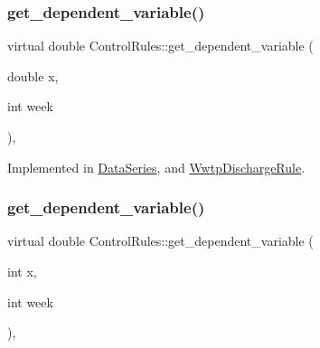 \mbox{\label{classControlRules_a4c5a86844c3d6409bfa0ba2b058f82e7_a4c5a86844c3d6409bfa0ba2b058f82e7}} 
\subsubsection{\texorpdfstring{get\+\_\+dependent\+\_\+variable()}{get\_dependent\_variable()}\hspace{0.1cm}{\footnotesize\ttfamily [3/4]}}
{\footnotesize\ttfamily virtual double Control\+Rules\+::get\+\_\+dependent\+\_\+variable (\begin{DoxyParamCaption}\item[{double}]{x,  }\item[{int}]{week }\end{DoxyParamCaption})\hspace{0.3cm}{\ttfamily [private]}, {}}



Implemented in \mbox{\hyperlink{classDataSeries_a1242b9fdbdbb4e91a0e8b9e2383085d8_a1242b9fdbdbb4e91a0e8b9e2383085d8}{Data\+Series}}, and \mbox{\hyperlink{classWwtpDischargeRule_a10eb6f901b6479dadc107e0a7c07e03b_a10eb6f901b6479dadc107e0a7c07e03b}{Wwtp\+Discharge\+Rule}}.

\mbox{\label{classControlRules_a3d4b00d92729c6662473fc25707c0d9b_a3d4b00d92729c6662473fc25707c0d9b}} 
\subsubsection{\texorpdfstring{get\+\_\+dependent\+\_\+variable()}{get\_dependent\_variable()}\hspace{0.1cm}{\footnotesize\ttfamily [4/4]}}
{\footnotesize\ttfamily virtual double Control\+Rules\+::get\+\_\+dependent\+\_\+variable (\begin{DoxyParamCaption}\item[{int}]{x,  }\item[{int}]{week }\end{DoxyParamCaption})\hspace{0.3cm}{\ttfamily [private]}, {}}



